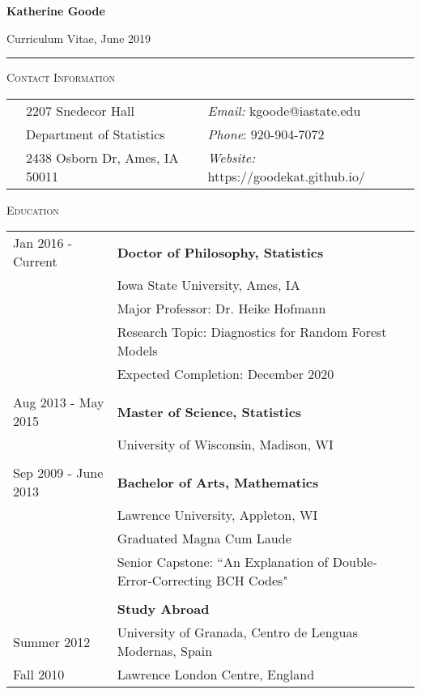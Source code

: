 \documentclass[10pt, oneside]{article}
\begin{document}
\begin{LARGE} \noindent\textbf{Katherine Goode} \end{LARGE} \hfill Curriculum Vitae, June 2019\\
\rule{\textwidth}{1pt}

\vspace{0.25cm}

\noindent \textsc{Contact Information} \hrulefill
\begin{longtable}{p{3.9cm}p{6.5cm}p{6.5cm}}
& 2207 Snedecor Hall & \emph{Email:} kgoode@iastate.edu\\
& Department of Statistics & \emph{Phone}: 920-904-7072\\
& 2438 Osborn Dr, Ames, IA 50011 & \emph{Website:} https://goodekat.github.io/
\end{longtable}

\noindent \textsc{Education} \hrulefill
\begin{longtable}{p{3.5cm}p{13cm}}
\hfill{Jan 2016 - Current} & \textbf{Doctor of Philosophy, Statistics}\\
& Iowa State University, Ames, IA\\
& Major Professor: Dr. Heike Hofmann\\
& Research Topic: Diagnostics for Random Forest Models\\
& Expected Completion: December 2020\\
\\
\hfill{Aug 2013 - May 2015} & \textbf{Master of Science, Statistics}\\
& University of Wisconsin, Madison, WI\\
\\
\hfill{Sep 2009 - June 2013} & \textbf{Bachelor of Arts, Mathematics}\\
& Lawrence University, Appleton, WI\\
& Graduated Magna Cum Laude\\
& Senior Capstone: ``An Explanation of Double-Error-Correcting BCH Codes"\\
\\
& \textbf{Study Abroad}\\
\hfill{Summer 2012} & \indent University of Granada, Centro de Lenguas Modernas, Spain\\
\hfill{Fall 2010} & \indent Lawrence London Centre, England
\end{longtable}
\end{document}
